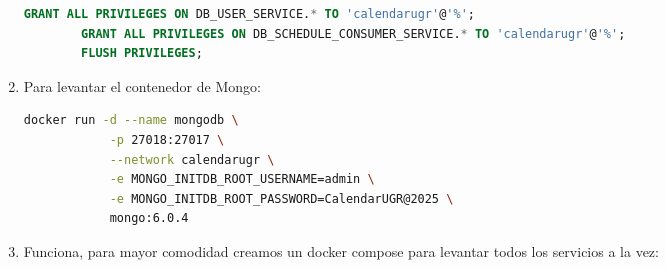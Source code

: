 \begin{enumerate}
\begin{lstlisting}[language=sql]
        GRANT ALL PRIVILEGES ON DB_USER_SERVICE.* TO 'calendarugr'@'%';
        GRANT ALL PRIVILEGES ON DB_SCHEDULE_CONSUMER_SERVICE.* TO 'calendarugr'@'%';
        FLUSH PRIVILEGES;
    \end{lstlisting}
    \item Para levantar el contenedor de Mongo:
    \begin{lstlisting}[language=bash]
        docker run -d --name mongodb \
            -p 27018:27017 \
            --network calendarugr \
            -e MONGO_INITDB_ROOT_USERNAME=admin \
            -e MONGO_INITDB_ROOT_PASSWORD=CalendarUGR@2025 \
            mongo:6.0.4
    \end{lstlisting}
    \item Funciona, para mayor comodidad creamos un docker compose para levantar todos los servicios a la vez:
    

\end{enumerate}
